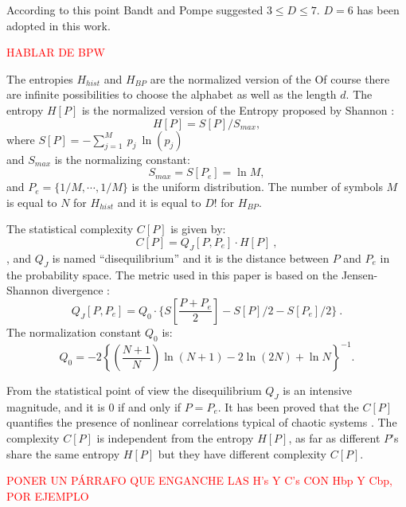 According to this point Bandt and Pompe suggested $3\leq D \leq 7$. $D=6$ has been adopted in this work.

\textcolor{red}{HABLAR DE BPW}

The entropies $H_{hist}$ and $H_{BP}$ are the normalized version of the Of course there are infinite possibilities to choose the alphabet as well as the length $d$.
The entropy $H[P]$ is the normalized version of the Entropy proposed by Shannon \cite{Shannon1949a}:
\begin{equation}\label{eq:sha}
H[P] = S[P] /S_{max},
\end{equation}
where $S[P]=-\sum _{j=1}^{M}~p_j~\ln( p_j )$\\ and $S_{max}$ is
the normalizing constant:
\begin{equation}
\label{eq:Smax} S_{max}= S[P_e] = \ln M,
\end{equation}
and $P_e=\{ 1/M, \cdots,1/M\}$ is the uniform distribution. The number of symbols $M$ is equal to $N$ for $H_{hist}$ and it is equal to $D!$ for $H_{BP}$.

The statistical complexity $C[P]$ is given by:
\begin{equation}
\label{eq:inten}
C[{P}]=Q_{J}[{P,P_e}]\cdot H[{P}] \ ,
\end{equation}
, and
$Q_{J}$ is named ``disequilibrium'' and it is the distance between $P$ and $P_e$ 
in the probability space. The metric used in this paper is based on the Jensen-Shannon divergence
\cite{Lamberti2004}:
\begin{equation}
\label{eq:disequi}
Q_{J}[{P,P_e}]= Q_0 \cdot \{S[\frac{P+P_e}{2}]-S[P]/2-S[P_e]/2 \} \ .
\end{equation}
The normalization constant $Q_0$ is:
\begin{equation}
\label{eq:q0j}
Q_0=-2 \left\{ \left( \frac{N+1}{N} \right) \ln(N+1) - 2 \ln(2N) + \ln N \right\}^{-1} .
\end{equation}

From the statistical point of view the disequilibrium $Q_J$ is an
intensive magnitude, and it is $0$ if and only if $P=P_e$. It has
been proved that the $C[P]$ quantifies the presence of nonlinear
correlations typical of chaotic systems
\cite{Martin2003,Lamberti2004}. The complexity $C[P]$ is
independent from the entropy $H[P]$, as far as different $P$'s share
the same entropy $H[P]$ but they have different complexity
$C[P]$.

\textcolor{red}{PONER UN PÁRRAFO QUE ENGANCHE LAS H's Y C's CON Hbp Y Cbp, POR EJEMPLO}

